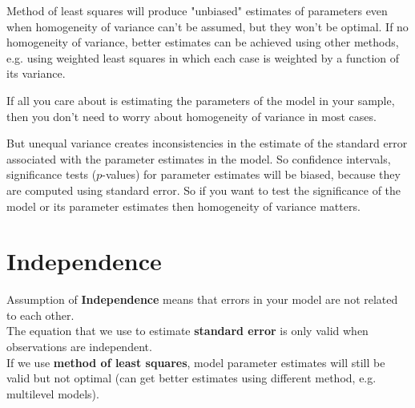 Method of least squares will produce "unbiased" estimates of parameters even when homogeneity of variance can't be assumed, but they won't be optimal. If no homogeneity of variance, better estimates can be achieved using other methods, e.g. using weighted least squares in which each case is weighted by a function of its variance. 

If all you care about is estimating the parameters of the model in your sample, then you don't need to worry about homogeneity of variance in most cases.

But unequal variance creates inconsistencies in the estimate of the standard error associated with the parameter estimates in the model. So confidence intervals, significance tests ($p$-values) for parameter estimates will be biased, because they are computed using standard error. So if you want to test the significance of the model or its parameter estimates then homogeneity of variance matters.
\section{Independence}

Assumption of \textbf{Independence} means that errors in your model are not related to each other. \\

The equation that we use to estimate \textbf{ standard error} is only valid when observations are independent. \\

If we use \textbf{method of least squares}, model parameter estimates will still be valid but not optimal (can get better estimates using different method, e.g. multilevel models).\\